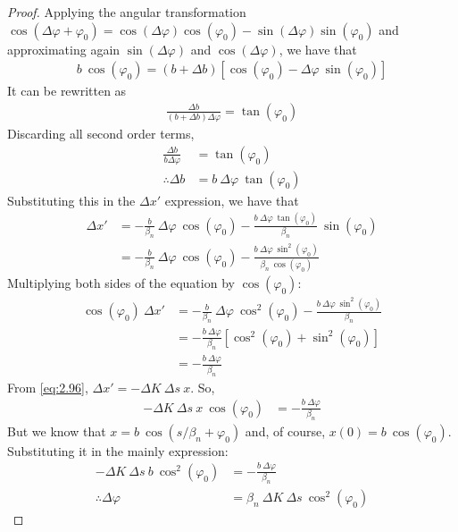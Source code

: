 \begin{proof}
	Applying the angular transformation $\cos(\Delta \varphi + \varphi_0) = \cos(\Delta \varphi)\cos(\varphi_0) - \sin(\Delta \varphi)\sin(\varphi_0)$ and approximating again $\sin(\Delta \varphi)$ and $\cos(\Delta \varphi)$, we have that
	\begin{align*}
		b\ \cos(\varphi_0) = (b+\Delta b)[\cos(\varphi_0)-\Delta \varphi\ \sin(\varphi_0)]
	\end{align*}
	It can be rewritten as
	\begin{align*}
		\frac{\Delta b}{(b+\Delta b)\Delta \varphi} = \tan(\varphi_0)
	\end{align*}
	Discarding all second order terms,
	\begin{align*}
		\frac{\Delta b}{b \Delta \varphi} &= \tan(\varphi_0)\\
		\therefore \Delta b &= b\ \Delta \varphi\ \tan(\varphi_0)
	\end{align*}
	Substituting this in the  $\Delta x'$ expression, we have that
	\begin{align*}
		\Delta x' &= -\frac{b}{\beta_n}\ \Delta \varphi\ \cos(\varphi_0) - \frac{b\ \Delta \varphi\ \tan(\varphi_0)}{\beta_n}\ \sin(\varphi_0)\\
				  &= -\frac{b}{\beta_n}\ \Delta \varphi\ \cos(\varphi_0) - \frac{b\ \Delta \varphi\ \sin^2(\varphi_0)}{\beta_n\ \cos(\varphi_0)}
	\end{align*}
	Multiplying both sides of the equation by $\cos(\varphi_0)$:
	\begin{align*}
		\cos(\varphi_0)\ \Delta x' &= -\frac{b}{\beta_n}\ \Delta \varphi\ \cos^2(\varphi_0) - \frac{b\ \Delta \varphi\ \sin^2(\varphi_0)}{\beta_n}\\
			&= -\frac{b\ \Delta \varphi}{\beta_n}[\cos^2(\varphi_0)+\sin^2(\varphi_0)]\\
			&= -\frac{b\ \Delta \varphi}{\beta_n}
	\end{align*}
	From \eqref{eq:2.96}, $\Delta x' = -\Delta K\ \Delta s\ x$. So,
	\begin{align*}
		-\Delta K\ \Delta s\ x\ \cos(\varphi_0) &= -\frac{b\ \Delta \varphi}{\beta_n}
	\end{align*}
	But we know that $x = b\ \cos(s/\beta_n + \varphi_0)$ and, of course, $x(0) = b\ \cos(\varphi_0)$. Substituting it in the mainly expression:
	\begin{align*}
		-\Delta K\ \Delta s\ b\ \cos^2(\varphi_0) &= -\frac{b\ \Delta \varphi}{\beta_n}\\
		\therefore \Delta \varphi &= \beta_n\ \Delta K\ \Delta s\ \cos^2(\varphi_0)
	\end{align*}

\end{proof}
